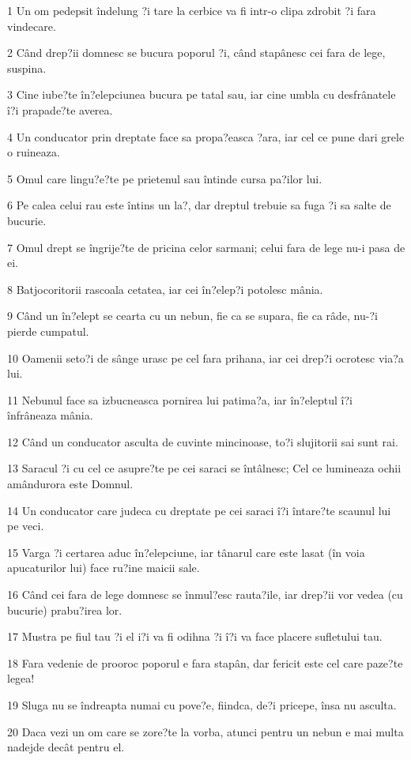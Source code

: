 \par 1 Un om pedepsit îndelung ?i tare la cerbice va fi intr-o clipa zdrobit ?i fara vindecare.
\par 2 Când drep?ii domnesc se bucura poporul ?i, când stapânesc cei fara de lege, suspina.
\par 3 Cine iube?te în?elepciunea bucura pe tatal sau, iar cine umbla cu desfrânatele î?i prapade?te averea.
\par 4 Un conducator prin dreptate face sa propa?easca ?ara, iar cel ce pune dari grele o ruineaza.
\par 5 Omul care lingu?e?te pe prietenul sau întinde cursa pa?ilor lui.
\par 6 Pe calea celui rau este întins un la?, dar dreptul trebuie sa fuga ?i sa salte de bucurie.
\par 7 Omul drept se îngrije?te de pricina celor sarmani; celui fara de lege nu-i pasa de ei.
\par 8 Batjocoritorii rascoala cetatea, iar cei în?elep?i potolesc mânia.
\par 9 Când un în?elept se cearta cu un nebun, fie ca se supara, fie ca râde, nu-?i pierde cumpatul.
\par 10 Oamenii seto?i de sânge urasc pe cel fara prihana, iar cei drep?i ocrotesc via?a lui.
\par 11 Nebunul face sa izbucneasca pornirea lui patima?a, iar în?eleptul î?i înfrâneaza mânia.
\par 12 Când un conducator asculta de cuvinte mincinoase, to?i slujitorii sai sunt rai.
\par 13 Saracul ?i cu cel ce asupre?te pe cei saraci se întâlnesc; Cel ce lumineaza ochii amândurora este Domnul.
\par 14 Un conducator care judeca cu dreptate pe cei saraci î?i întare?te scaunul lui pe veci.
\par 15 Varga ?i certarea aduc în?elepciune, iar tânarul care este lasat (în voia apucaturilor lui) face ru?ine maicii sale.
\par 16 Când cei fara de lege domnesc se înmul?esc rauta?ile, iar drep?ii vor vedea (cu bucurie) prabu?irea lor.
\par 17 Mustra pe fiul tau ?i el i?i va fi odihna ?i î?i va face placere sufletului tau.
\par 18 Fara vedenie de prooroc poporul e fara stapân, dar fericit este cel care paze?te legea!
\par 19 Sluga nu se îndreapta numai cu pove?e, fiindca, de?i pricepe, însa nu asculta.
\par 20 Daca vezi un om care se zore?te la vorba, atunci pentru un nebun e mai multa nadejde decât pentru el.
